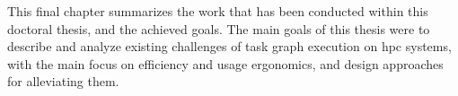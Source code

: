 This final chapter summarizes the work that has been conducted within this doctoral thesis, and the
achieved goals. The main goals of this thesis were to describe and analyze existing challenges of
task graph execution on \gls{hpc} systems, with the main focus on efficiency and usage ergonomics, and design
approaches for alleviating them.

